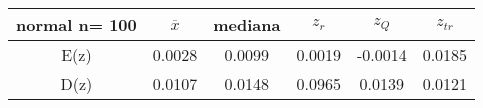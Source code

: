 \begin{tabular}{|c|c|c|c|c|c|}
\hline
normal n= 100& $\overline{x}$ & mediana & $z_r$ & $z_Q$ & $z_{tr}$ \\ \hline
E(z) & 0.0028 & 0.0099 & 0.0019 & -0.0014 & 0.0185 \\ \hline
D(z) & 0.0107 & 0.0148 & 0.0965 & 0.0139 & 0.0121 \\ \hline
\end{tabular}